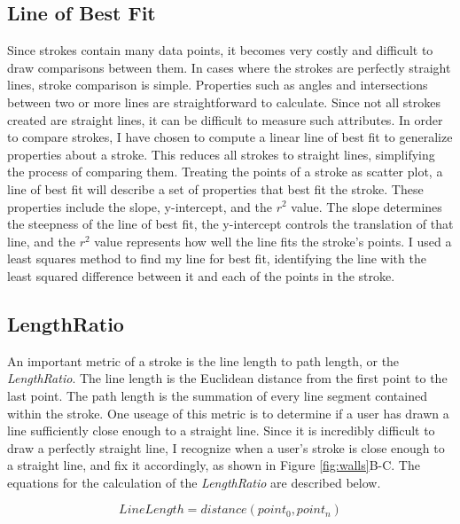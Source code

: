 \subsection{Line of Best Fit}
\label{sec:bestfit}
Since strokes contain many data points, it becomes very costly and difficult to draw comparisons between them. In cases where the strokes are perfectly straight lines, stroke comparison is simple. Properties such as angles and intersections between two or more lines are straightforward to calculate. Since not all strokes created are straight lines, it can be difficult to measure such attributes. In order to compare strokes, I have chosen to compute a linear line of best fit to generalize properties about a stroke. This reduces all strokes to straight lines, simplifying the process of comparing them. Treating the points of a stroke as scatter plot, a line of best fit will describe a set of properties that best fit the stroke. These properties include the slope, y-intercept, and the $r^2$ value. The slope determines the steepness of the line of best fit, the y-intercept controls the translation of that line, and the $r^2$ value represents how well the line fits the stroke's points. I used a least squares method to find my line for best fit, identifying the line with the least squared difference between it and each of the points in the stroke.

\subsection{LengthRatio}
\label{sec:lengthratio}

An important metric of a stroke is the line length to path length, or the \textit{LengthRatio}. The line length is the Euclidean distance from the first point to the last point. The path length is the summation of every line segment contained within the stroke. One useage of this metric is to determine if a user has drawn a line sufficiently close enough to a straight line. Since it is incredibly difficult to draw a perfectly straight line, I recognize when a user's stroke is close enough to a straight line, and fix it accordingly, as shown in Figure \ref{fig:walls}B-C. The equations for the calculation of the \textit{LengthRatio} are described below.

\begin{equation}
\label{equ:ratio1}
LineLength = distance(point_{0}, point_{n})
\end{equation}

